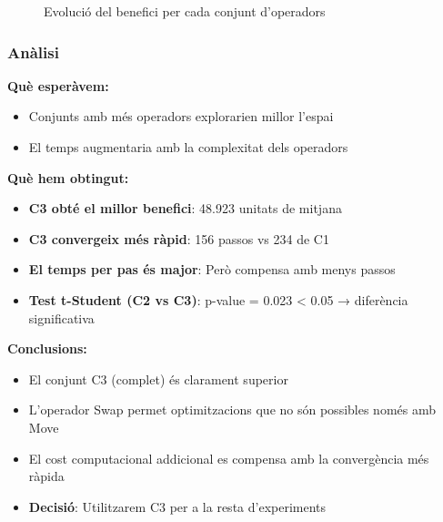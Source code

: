 \begin{figure}[H]
\centering
\caption{Evolució del benefici per cada conjunt d'operadors}
\label{fig:exp1-operadors}
\end{figure}

\subsubsection{Anàlisi}

\textbf{Què esperàvem:}
\begin{itemize}
    \item Conjunts amb més operadors explorarien millor l'espai
    \item El temps augmentaria amb la complexitat dels operadors
\end{itemize}

\textbf{Què hem obtingut:}
\begin{itemize}
    \item \textbf{C3 obté el millor benefici}: 48.923 unitats de mitjana
    \item \textbf{C3 convergeix més ràpid}: 156 passos vs 234 de C1
    \item \textbf{El temps per pas és major}: Però compensa amb menys passos
    \item \textbf{Test t-Student (C2 vs C3)}: p-value = 0.023 < 0.05 → diferència significativa
\end{itemize}

\textbf{Conclusions:}
\begin{itemize}
    \item El conjunt C3 (complet) és clarament superior
    \item L'operador Swap permet optimitzacions que no són possibles només amb Move
    \item El cost computacional addicional es compensa amb la convergència més ràpida
    \item \textbf{Decisió}: Utilitzarem C3 per a la resta d'experiments
\end{itemize}